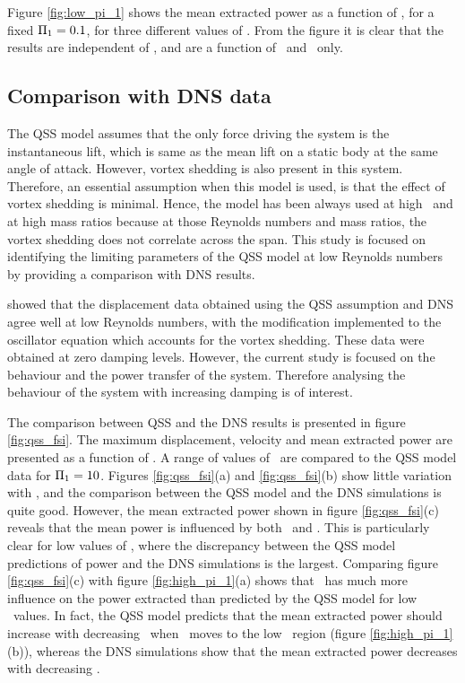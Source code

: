 Figure \ref{fig:low_pi_1} shows the mean extracted power as a function of \massdamp, for a fixed $\Pi_1 = 0.1$, for three different values of \mstar. From the figure it is clear that the results are independent of \mstar, and are a function of \massstiff\ and \massdamp\ only.



\subsection{Comparison with DNS data}
\label{sec:dns}

The QSS model assumes that the only force driving the system is the instantaneous lift, which is same as the mean lift on a static body at the same angle of attack. However, vortex shedding is also present in this system. Therefore, an essential assumption when this model is used, is that the effect of vortex shedding is minimal. Hence, the model has been always used at high \reynoldsnumber \ and  at high mass ratios because at those Reynolds numbers and mass ratios, the vortex shedding does not correlate across the span. This study is focused on identifying the limiting parameters of the QSS model at low Reynolds numbers by providing a comparison with DNS results. 

\citet{Joly2012} showed that the displacement data obtained using the QSS assumption and DNS agree well at low Reynolds numbers, with the modification implemented to the oscillator equation which accounts for the vortex shedding. These data were obtained at zero damping levels. However, the current study is focused on the behaviour and the power transfer of the system. Therefore analysing the behaviour of the system with increasing damping is of interest.

The comparison between QSS and the DNS results is presented in figure \ref{fig:qss_fsi}. The maximum displacement, velocity and mean extracted power are presented as a function of \massdamp. A range of values of \massstiff\ are compared to the QSS model data for $\Pi_1 = 10$. Figures \ref{fig:qss_fsi}(a) and \ref{fig:qss_fsi}(b) show little variation with \massstiff, and the comparison between the QSS model and the DNS simulations is quite good. However, the mean extracted power shown in figure \ref{fig:qss_fsi}(c) reveals that the mean power is influenced by both \massstiff\ and \massdamp. This is particularly clear for low values of \massstiff, where the discrepancy between the QSS model predictions of power and the DNS simulations is the largest. Comparing figure \ref{fig:qss_fsi}(c) with figure \ref{fig:high_pi_1}(a) shows that \massstiff\ has much more influence on the power extracted than predicted by the QSS model for low \massstiff \ values. In fact, the QSS model predicts that the mean extracted power should increase with decreasing \massstiff\ when \massstiff\ moves to the low \massstiff\ region (figure \ref{fig:high_pi_1}(b)), whereas the DNS simulations show that the mean extracted power decreases with decreasing \massstiff.

